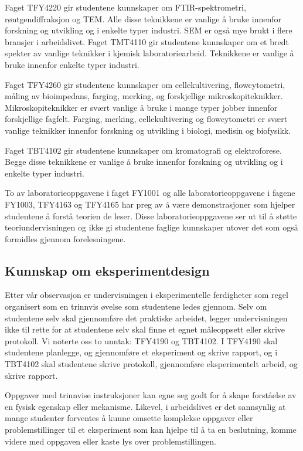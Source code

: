 \documentclass{article}
\begin{document}
Faget TFY4220 gir studentene kunnskaper om FTIR-spektrometri, røntgendiffraksjon og TEM. Alle disse teknikkene er vanlige å bruke innenfor forskning og utvikling og i enkelte typer industri. SEM er også mye brukt i flere bransjer i arbeidslivet. Faget TMT4110 gir studentene kunnskaper om et bredt spekter av vanlige teknikker i kjemisk laboratoriearbeid. Teknikkene er vanlige å bruke innenfor enkelte typer industri.

Faget TFY4260 gir studentene kunnskaper om cellekultivering, flowcytometri, måling av bioimpedans, farging, merking, og forskjellige mikroskopiteknikker. Mikroskopiteknikker er svært vanlige å bruke i mange typer jobber innenfor forskjellige fagfelt. Farging, merking, cellekultivering og flowcytometri er svært vanlige teknikker innenfor forskning og utvikling i biologi, medisin og biofysikk.

Faget TBT4102 gir studentene kunnskaper om kromatografi og elektroforese. Begge disse teknikkene er vanlige å bruke innenfor forskning og utvikling og i enkelte typer industri.

To av laboratorieoppgavene i faget FY1001 og alle laboratorieoppgavene i fagene FY1003, TFY4163 og TFY4165 har preg av å være demonstrasjoner som hjelper studentene å forstå teorien de leser. Disse laboratorieoppgavene ser ut til å støtte teoriundervisningen og ikke gi studentene faglige kunnskaper utover det som også formidles gjennom forelesningene.

\subsection{Kunnskap om eksperimentdesign}
Etter vår observasjon er undervisningen i eksperimentelle ferdigheter som regel organisert som en trinnvis øvelse som studentene ledes gjennom. Selv om studentene selv skal gjennomføre det praktiske arbeidet, legger undervisningen ikke til rette for at studentene selv skal finne et egnet måleoppsett eller skrive protokoll. Vi noterte oss to unntak: TFY4190 og TBT4102. I TFY4190 skal studentene planlegge, og gjennomføre et eksperiment og skrive rapport, og i TBT4102 skal studentene skrive protokoll, gjennomføre eksperimentelt arbeid, og skrive rapport.

Oppgaver med trinnvise instruksjoner kan egne seg godt for å skape forståelse av en fysisk egenskap eller mekanisme. Likevel, i arbeidslivet er det sannsynlig at mange studenter forventes å kunne omsette komplekse oppgaver eller problemstillinger til et eksperiment som kan hjelpe til å ta en beslutning, komme videre med oppgaven eller kaste lys over problemstillingen.
\end{document}
